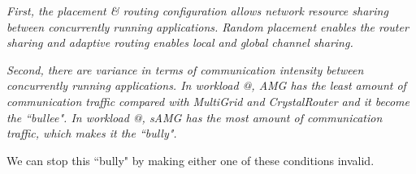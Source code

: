 \documentclass[conference,compsoc]{IEEEtran}
\makeatletter
\newcommand{\Rmnum}[1]{\expandafter\@slowromancap\romannumeral #1@}
\makeatother
\begin{document}
\emph{First, the placement \& routing configuration allows network resource sharing between concurrently running applications. Random placement enables the router sharing and adaptive routing enables local and global channel sharing.}

\emph{Second, there are variance in terms of communication intensity between concurrently running applications. In workload \Rmnum{1}, AMG has the least amount of communication traffic compared with MultiGrid and CrystalRouter and it become the ``bullee". In workload \Rmnum{2}, sAMG has the most amount of communication traffic, which makes it the ``bully". }

We can stop this ``bully" by making either one of these conditions invalid. 


%


\end{document}
